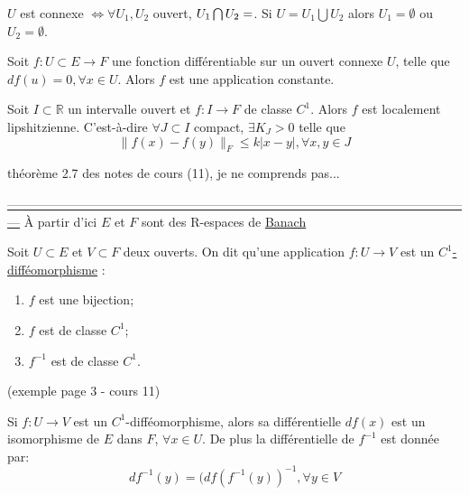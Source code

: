 \documentclass[12pt,a4paper]{article}
\begin{document}
\begin{flushleft}
\begin{rem}
$U$ est connexe $\Leftrightarrow \forall U_1, U_2$ ouvert, $U_1 \bigcap U_2 = \empty$. Si $U=U_1 \bigcup U_2$ alors $U_1 = \emptyset$ ou $U_2 = \emptyset$.
\end{rem}


\begin{thm}
Soit $f: U \subset E \longrightarrow F$ une fonction différentiable sur un ouvert connexe $U$, telle que $df(u) = 0, \forall x \in U$. Alors $f$ est une application constante.
\end{thm}



\begin{thm}
Soit $I \subset \mathbb{R}$ un intervalle ouvert et $f: I \longrightarrow F$ de classe $C^1$. Alors $f$ est localement lipshitzienne. C'est-à-dire $\forall J \subset I$ compact, $\exists K_J >0 $ telle que $$ \lVert f(x) - f(y) \rVert_F \leq k |x-y|, \forall x, y \in J$$
\end{thm}


\begin{thm}
théorème 2.7 des notes de cours (11), je ne comprends pas...
\end{thm}

\underline{---------------------------------------------------------------------------------------------------------------}
À partir d'ici $E$ et $F$ sont des R-espaces de \underline{Banach}

\begin{mydef}
Soit $U \subset E$ et $V \subset F$ deux ouverts. On dit qu'une application $f:U \longrightarrow V$ est un \underline{$C^1$-difféomorphisme} \ssi :
\begin{enumerate}
\item $f$ est une bijection;
\item $f$ est de classe $C^1$;
\item $f^{-1}$ est de classe $C^1$.
\end{enumerate}
\end{mydef}

(exemple page 3 - cours 11)


\begin{thm}
Si $f: U \longrightarrow V$ est un $C^1$-difféomorphisme, alors sa différentielle $df(x)$ est un isomorphisme de $E$ dans $F$, $\forall x \in U$. De plus la différentielle de $f^{-1}$ est donnée par: $$df^{-1}(y)= (df(f^{-1}(y))^{-1}, \forall y \in V$$
\end{thm}



\end{flushleft}
\end{document}

